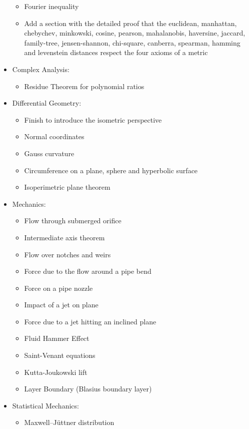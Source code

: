 \begin{itemize}
\begin{itemize}
				\item Fourier inequality
				\item Add a section with the detailed proof that the euclidean, manhattan, chebychev, minkowski, cosine, pearson, mahalanobis, haversine, jaccard, family-tree, jensen-shannon, chi-square, canberra, spearman, hamming and levenstein distances respect the four axioms of a metric
			\end{itemize}
		\item Complex Analysis: 
			\begin{itemize}
				\item Residue Theorem for polynomial ratios
			\end{itemize}			
		\item Differential Geometry: 
			\begin{itemize}
				\item Finish to introduce the isometric perspective
				\item Normal coordinates
				\item Gauss curvature
				\item Circumference on a plane, sphere and hyperbolic surface
				\item Isoperimetric plane theorem
			\end{itemize}
		\item Mechanics: 
			\begin{itemize}
				\item Flow through submerged orifice
				\item Intermediate axis theorem
				\item Flow over notches and weirs
				\item Force due to the flow around a pipe bend
				\item Force on a pipe nozzle
				\item Impact of a jet on plane
				\item Force due to a jet hitting an inclined plane
				\item Fluid Hammer Effect
				\item Saint-Venant equations
				\item Kutta-Joukowski lift
				\item Layer Boundary (Blasius boundary layer)
			\end{itemize}	
		\item Statistical Mechanics: 
			\begin{itemize}
				\item Maxwell–Jüttner distribution
			\end{itemize}	

\end{itemize}
